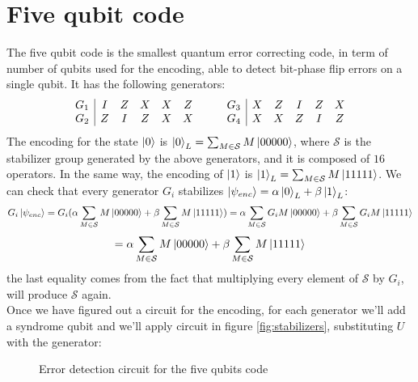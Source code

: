 \documentclass{article}
\begin{document}
	 \section{Five qubit code}
	 The five qubit code is the smallest quantum error correcting code, in term of number of qubits used for the encoding, able to detect bit-phase flip errors on a single qubit. It has the following generators:
	 \[
	 \begin{array}{c|c c c c c}
	 	G_1 & I & Z & X & X & Z\\
	 	G_2 & Z & I & Z & X & X
	 \end{array}\qquad
	 \begin{array}{c|c c c c c}
	 	G_3 & X & Z & I & Z & X\\
	 	G_4 & X & X & Z & I & Z
	 \end{array}
	 \]
	 The encoding for the state $\ket{0}$ is $\ket{0}_L = \sum_{M \in \mathcal{S}}M\ket{00000}$, where $\mathcal{S}$ is the stabilizer group generated by the above generators, and it is composed of $16$ operators. In the same way, the encoding of $\ket{1}$ is $\ket{1}_L = \sum_{M \in \mathcal{S}}M\ket{11111}$. We can check that every generator $G_i$ stabilizes $\ket{\psi_{enc}} = \alpha\ket{0}_L + \beta\ket{1}_L$:
	 \[ G_i\ket{\psi_{enc}} = G_i(\alpha\sum_{M \in \mathcal{S}}M\ket{00000} + \beta\sum_{M \in \mathcal{S}}M\ket{11111}) = \alpha\sum_{M \in \mathcal{S}}G_iM\ket{00000} + \beta\sum_{M \in \mathcal{S}}G_iM\ket{11111} \]
	 \[  = \alpha\sum_{M \in \mathcal{S}}M\ket{00000} + \beta\sum_{M \in \mathcal{S}}M\ket{11111} \]
	 the last equality comes from the fact that multiplying every element of $\mathcal{S}$ by $G_i$, will produce $\mathcal{S}$ again.\\
	 Once we have figured out a circuit for the encoding, for each generator we'll add a syndrome qubit and we'll apply circuit in figure \ref{fig:stabilizers}, substituting $U$ with the generator: 
	 \begin{figure}[H]
	 	\centering
 		\caption{Error detection circuit for the five qubits code}
	\end{figure}
\end{document}
